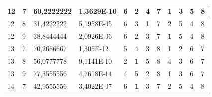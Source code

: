 \documentclass[conference]{IEEEtran}
\begin{document}
\begin{table}[]
\begin{tabular}{|llll|llllllll|}
		\multicolumn{1}{|l|}{12}  & \multicolumn{1}{l|}{7}         & \multicolumn{1}{l|}{60,2222222}    & 1,3629E-10 & \multicolumn{1}{l|}{6}   & \multicolumn{1}{l|}{2}          & \multicolumn{1}{l|}{4}          & \multicolumn{1}{l|}{7}          & \multicolumn{1}{l|}{\textbf{1}} & \multicolumn{1}{l|}{3}          & \multicolumn{1}{l|}{5}   & 8                      \\ \hline
		\multicolumn{1}{|l|}{12}  & \multicolumn{1}{l|}{8}         & \multicolumn{1}{l|}{31,4222222}    & 5,1958E-05 & \multicolumn{1}{l|}{6}   & \multicolumn{1}{l|}{3}          & \multicolumn{1}{l|}{\textbf{1}} & \multicolumn{1}{l|}{7}          & \multicolumn{1}{l|}{2}          & \multicolumn{1}{l|}{5}          & \multicolumn{1}{l|}{4}   & 8                      \\ \hline
		\multicolumn{1}{|l|}{12}  & \multicolumn{1}{l|}{9}         & \multicolumn{1}{l|}{38,8444444}    & 2,0926E-06 & \multicolumn{1}{l|}{6}   & \multicolumn{1}{l|}{2}          & \multicolumn{1}{l|}{3}          & \multicolumn{1}{l|}{7}          & \multicolumn{1}{l|}{\textbf{1}} & \multicolumn{1}{l|}{5}          & \multicolumn{1}{l|}{4}   & 8                      \\ \hline
		\multicolumn{1}{|l|}{13}  & \multicolumn{1}{l|}{7}         & \multicolumn{1}{l|}{70,2666667}    & 1,305E-12  & \multicolumn{1}{l|}{5}   & \multicolumn{1}{l|}{4}          & \multicolumn{1}{l|}{3}          & \multicolumn{1}{l|}{8}          & \multicolumn{1}{l|}{\textbf{1}} & \multicolumn{1}{l|}{2}          & \multicolumn{1}{l|}{6}   & 7                      \\ \hline
		\multicolumn{1}{|l|}{13}  & \multicolumn{1}{l|}{8}         & \multicolumn{1}{l|}{56,0777778}    & 9,1141E-10 & \multicolumn{1}{l|}{2}   & \multicolumn{1}{l|}{\textbf{1}} & \multicolumn{1}{l|}{5}          & \multicolumn{1}{l|}{8}          & \multicolumn{1}{l|}{4}          & \multicolumn{1}{l|}{3}          & \multicolumn{1}{l|}{6}   & 7                      \\ \hline
		\multicolumn{1}{|l|}{13}  & \multicolumn{1}{l|}{9}         & \multicolumn{1}{l|}{77,3555556}    & 4,7618E-14 & \multicolumn{1}{l|}{4}   & \multicolumn{1}{l|}{5}          & \multicolumn{1}{l|}{2}          & \multicolumn{1}{l|}{8}          & \multicolumn{1}{l|}{\textbf{1}} & \multicolumn{1}{l|}{3}          & \multicolumn{1}{l|}{6}   & 7                      \\ \hline
		\multicolumn{1}{|l|}{14}  & \multicolumn{1}{l|}{7}         & \multicolumn{1}{l|}{42,9555556}    & 3,4022E-07 & \multicolumn{1}{l|}{6}   & \multicolumn{1}{l|}{\textbf{1}} & \multicolumn{1}{l|}{3}          & \multicolumn{1}{l|}{7}          & \multicolumn{1}{l|}{2}          & \multicolumn{1}{l|}{5}          & \multicolumn{1}{l|}{4}   & 8                      \\ \hline

\end{tabular}
\end{table}
\end{document}
